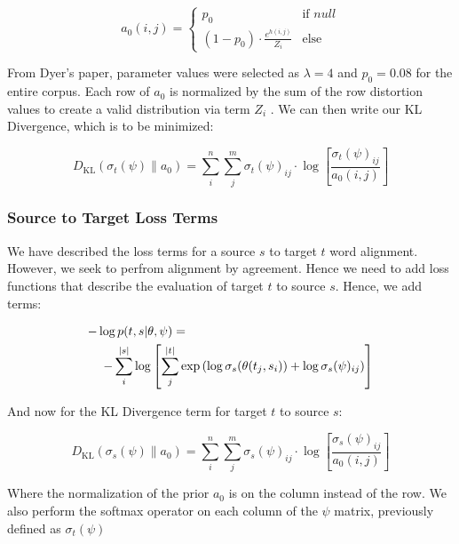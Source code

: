 \documentclass[twoside,twocolumn]{article}
\begin{document}
\begin{equation}
a_0 (i, j) =
\begin{cases}
      p_0 & \text{if } null \\
     (1-p_0) \cdot \frac{e^{h(i,j)}}{Z_i} & \text{else}
   \end{cases}
\end{equation}

From Dyer's paper, parameter values were selected as $\lambda=4$ and $p_0=0.08$ for the entire corpus. Each row of $a_0$ is normalized by the sum of the row distortion values to create a valid distribution via term $Z_i$ \cite{dyer2013simple}. We can then write our KL Divergence, which is to be minimized:

\begin{equation}
  D_{\mathrm{KL}} (  \sigma_t(\psi) \| a_0) = \sum_i^n \sum_j^m \sigma_t(\psi)_{ij}  \cdot \log \left[ \frac{\sigma_t(\psi)_{ij}}{a_0(i, j)} \right]
\end{equation}



\subsubsection{Source to Target Loss Terms}
We have described the loss terms for a source $s$ to target $t$ word alignment. However, we seek to perfrom alignment by agreement. Hence we need to add loss functions that describe the evaluation of target $t$ to source $s$. Hence, we add terms:

\begin{equation}
  \centering
  \begin{split}
  -\log  p(t & , s | \theta, \psi) = \\
  - \sum_i^{|s|} & \log \left[ \sum_j^{|t|} \exp \left( \log \sigma_s(\theta(t_j, s_i)) + \log \sigma_s(\psi)_{ij} \right) \right]
\end{split}
\end{equation}

And now for the KL Divergence term for target $t$ to source $s$:

\begin{equation}
  D_{\mathrm{KL}} (  \sigma_s(\psi) \| a_0) = \sum_i^n \sum_j^m \sigma_s(\psi)_{ij}  \cdot \log \left[ \frac{\sigma_s(\psi)_{ij}}{a_0(i, j)} \right]
\end{equation}

Where the normalization of the prior $a_0$ is on the column instead of the row. We also perform the softmax operator on each column of the $\psi$ matrix, previously defined as $\sigma_t(\psi)$
\end{document}
